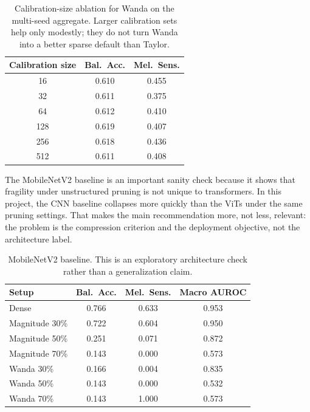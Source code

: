 \documentclass{article}
\begin{document}
\begin{table}[t]
\centering
\small
\caption{Calibration-size ablation for Wanda on the multi-seed aggregate. Larger calibration sets help only modestly; they do not turn Wanda into a better sparse default than Taylor.}
\label{tab:calibration}
\begin{tabular}{ccc}
\toprule
Calibration size & Bal.\ Acc. & Mel.\ Sens. \\
\midrule
16  & 0.610 & 0.455 \\
32  & 0.611 & 0.375 \\
64  & 0.612 & 0.410 \\
128 & 0.619 & 0.407 \\
256 & 0.618 & 0.436 \\
512 & 0.611 & 0.408 \\
\bottomrule
\end{tabular}
\end{table}

The MobileNetV2 baseline is an important sanity check because it shows that fragility under unstructured pruning is not unique to transformers. In this project, the CNN baseline collapses more quickly than the ViTs under the same pruning settings. That makes the main recommendation more, not less, relevant: the problem is the compression criterion and the deployment objective, not the architecture label.

\begin{table}[t]
\centering
\small
\caption{MobileNetV2 baseline. This is an exploratory architecture check rather than a generalization claim.}
\label{tab:mobilenet}
\begin{tabular}{lccc}
\toprule
Setup & Bal.\ Acc. & Mel.\ Sens. & Macro AUROC \\
\midrule
Dense      & 0.766 & 0.633 & 0.953 \\
Magnitude 30\% & 0.722 & 0.604 & 0.950 \\
Magnitude 50\% & 0.251 & 0.071 & 0.872 \\
Magnitude 70\% & 0.143 & 0.000 & 0.573 \\
Wanda 30\%     & 0.166 & 0.004 & 0.835 \\
Wanda 50\%     & 0.143 & 0.000 & 0.532 \\
Wanda 70\%     & 0.143 & 1.000 & 0.573 \\
\bottomrule
\end{tabular}
\end{table}
\end{document}
